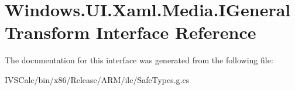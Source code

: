 \hypertarget{interface_windows_1_1_u_i_1_1_xaml_1_1_media_1_1_i_general_transform}{}\section{Windows.\+U\+I.\+Xaml.\+Media.\+I\+General\+Transform Interface Reference}
\label{interface_windows_1_1_u_i_1_1_xaml_1_1_media_1_1_i_general_transform}


The documentation for this interface was generated from the following file\+:\begin{DoxyCompactItemize}
\item 
I\+V\+S\+Calc/bin/x86/\+Release/\+A\+R\+M/ilc/Safe\+Types.\+g.\+cs\end{DoxyCompactItemize}

